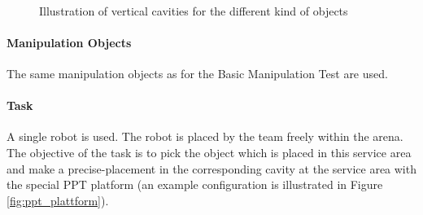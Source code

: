 \begin{figure}
\begin{center}
 \\
\end{center}
\caption{Illustration of vertical cavities for the different kind of objects}
\label{fig:ppt_horizontal_tiles}
\end{figure}

\paragraph{Manipulation Objects}
The same manipulation objects as for the Basic Manipulation Test are used. 

\paragraph{Task}
A single robot is used. The robot is placed by the team freely within the arena. The objective of the task is to pick the object which is placed in this service area and make a precise-placement in the corresponding cavity at the service area with the special PPT platform (an example configuration is illustrated in Figure \ref{fig:ppt_plattform}). 

